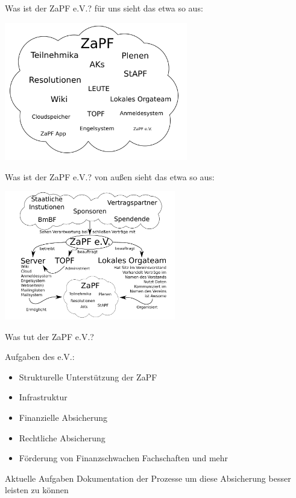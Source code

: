 \documentclass[compress, aspectratio=169]{beamer}
\begin{document}
\thispagestyle{empty}
\begin{frame}{Was ist der ZaPF e.V.?}
für uns sieht das etwa so aus: \\
  \begin{center}
    \includegraphics[width=0.6\textwidth]{uns}
  \end{center}
\end{frame}

\thispagestyle{empty}
\begin{frame}{Was ist der ZaPF e.V.?}
von außen sieht das etwa so aus: \\
  \begin{center}
    \includegraphics[width=0.56\textwidth]{aussen}
  \end{center}
\end{frame}

\pagestyle{empty}
\begin{frame}{Was tut der ZaPF e.V.?}
\begin{block}{Aufgaben des e.V.:}
\begin{itemize}
\item Strukturelle Unterstützung der ZaPF
\item Infrastruktur
\item Finanzielle Absicherung
\item Rechtliche Absicherung
\item Förderung von Finanzschwachen Fachschaften und mehr
\end{itemize}
\end{block}
\pause
\begin{block}{Aktuelle Aufgaben}
Dokumentation der Prozesse um diese Absicherung besser leisten zu können
\end{block}
\end{frame}
\end{document}
